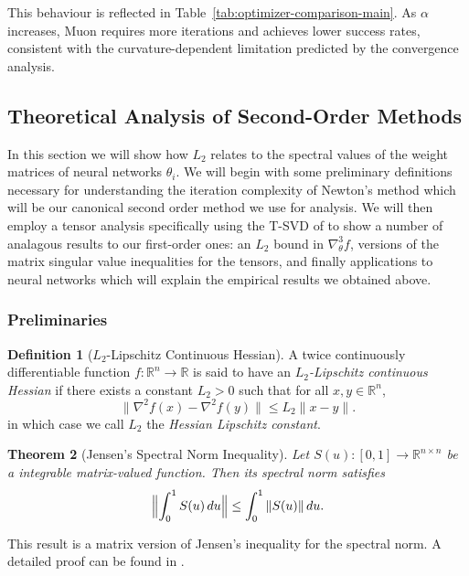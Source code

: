 \documentclass{article}
\theoremstyle{plain}
\newtheorem{theorem}{Theorem}
\theoremstyle{definition}
\newtheorem{definition}[theorem]{Definition}
\theoremstyle{remark}
\begin{document}
This behaviour is reflected in Table~\ref{tab:optimizer-comparison-main}.
As $\alpha$ increases, Muon requires more iterations and achieves lower success rates, consistent with the curvature-dependent limitation predicted by the convergence analysis.


\subsection{Theoretical Analysis of Second-Order Methods}

In this section we will show how $L_2$ relates to the spectral values of the weight matrices of neural networks $\theta_i$. We will begin with some preliminary definitions necessary for understanding the iteration complexity of Newton's method which will be our canonical second order method we use for analysis. We will then employ a tensor analysis specifically using the T-SVD of \citet{zhang2021note} to show a number of analagous results to our first-order ones: an $L_2$ bound in $\nabla^3_{\theta}f$, versions of the matrix singular value inequalities for the tensors, and finally applications to neural networks which will explain the empirical results we obtained above.

\subsubsection{Preliminaries}
\begin{definition}[$L_2$-Lipschitz Continuous Hessian]
\label{def:lip-cont-hes}
A twice continuously differentiable function $f:\mathbb{R}^n\to\mathbb{R}$ 
is said to have an \emph{$L_2$-Lipschitz continuous Hessian} if there exists a constant $L_2>0$ such that
for all $x,y\in\mathbb{R}^n$,
\[
\|\nabla^{2} f(x)-\nabla^{2} f(y)\|\le L_2\|x-y\|.
\]
in which case we call $L_2$ the \emph{Hessian Lipschitz constant}.
\end{definition}

\begin{theorem}[Jensen's Spectral Norm Inequality]
\label{theorem:jensen-spect}
Let $S(u): [0,1] \to \mathbb{R}^{n \times n}$ be a integrable matrix-valued function. 
Then its spectral norm satisfies
\[
\Bigl\| \int_0^1 S(u)\,du \Bigr\| 
\le \int_0^1 \|S(u)\|\,du.
\]
\end{theorem}
This result is a matrix version of Jensen’s inequality for the spectral norm. 
A detailed proof can be found in \citet{zhang2023notes}. %
\end{document}
